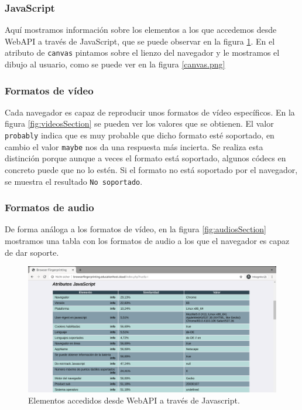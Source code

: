 \subsubsection{JavaScript}
Aquí mostramos información sobre los elementos a los que accedemos desde WebAPI a través de JavaScript, que se puede observar en la figura \ref{fig:javaScriptSection.png}. En el atributo de \texttt{canvas} pintamos sobre el lienzo del navegador y le mostramos el dibujo al usuario, como se puede ver en la figura \ref{canvas.png}

\subsubsection{Formatos de vídeo}
Cada navegador es capaz de reproducir unos formatos de vídeo específicos. En la figura \ref{fig:videosSection} se pueden ver los valores que se obtienen. El valor \texttt{probably} indica que es muy probable que dicho formato esté soportado, en cambio el valor \texttt{maybe} nos da una respuesta más incierta. Se realiza esta distinción porque aunque a veces el formato está soportado, algunos códecs en concreto puede que no lo estén. Si el formato no está soportado por el navegador, se muestra el resultado \texttt{No soportado}.

\subsubsection{Formatos de audio}
De forma análoga a los formatos de vídeo, en la figura \ref{fig:audiosSection} mostramos una tabla con los formatos de audio a los que el navegador es capaz de dar soporte.

\begin{figure}[tbp]
	\centering
	\includegraphics[width=1\textwidth]{Images/javaScriptSection.png}
	\caption{Elementos accedidos desde WebAPI a través de Javascript.}
	\label{fig:javaScriptSection.png}
\end{figure}

